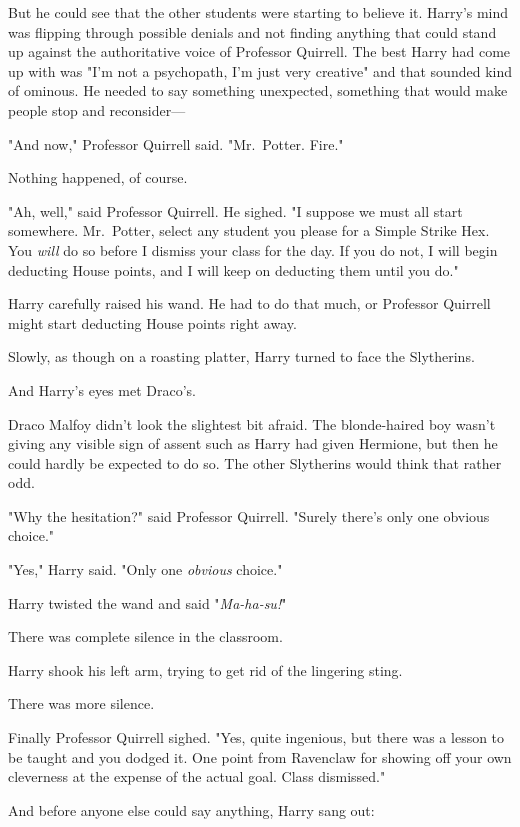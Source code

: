 But he could see that the other students were starting to believe it. Harry's 
mind was flipping through possible denials and not finding anything that could 
stand up against the authoritative voice of Professor Quirrell. The best Harry 
had come up with was "I'm not a psychopath, I'm just very creative" and that 
sounded kind of ominous. He needed to say something unexpected, something that 
would make people stop and reconsider---

"And now," Professor Quirrell said. "Mr.~Potter. Fire."

Nothing happened, of course.

"Ah, well," said Professor Quirrell. He sighed. "I suppose we must all start 
somewhere. Mr.~Potter, select any student you please for a Simple Strike Hex. 
You \emph{will} do so before I dismiss your class for the day. If you do not, I 
will begin deducting House points, and I will keep on deducting them until you 
do."

Harry carefully raised his wand. He had to do that much, or Professor Quirrell 
might start deducting House points right away.

Slowly, as though on a roasting platter, Harry turned to face the Slytherins.

And Harry's eyes met Draco's.

Draco Malfoy didn't look the slightest bit afraid. The blonde-haired boy wasn't 
giving any visible sign of assent such as Harry had given Hermione, but then he 
could hardly be expected to do so. The other Slytherins would think that rather 
odd.

"Why the hesitation?" said Professor Quirrell. "Surely there's only one obvious 
choice."

"Yes," Harry said. "Only one \emph{obvious} choice."

Harry twisted the wand and said "\emph{Ma-ha-su!}"

There was complete silence in the classroom.

Harry shook his left arm, trying to get rid of the lingering sting.

There was more silence.

Finally Professor Quirrell sighed. "Yes, quite ingenious, but there was a 
lesson to be taught and you dodged it. One point from Ravenclaw for showing off 
your own cleverness at the expense of the actual goal. Class dismissed."

And before anyone else could say anything, Harry sang out:

